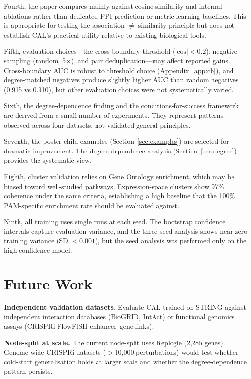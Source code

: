 \documentclass[11pt]{article}
\begin{document}
Fourth, the paper compares mainly against cosine similarity and internal ablations rather than dedicated PPI prediction or metric-learning baselines. This is appropriate for testing the association $\neq$ similarity principle but does not establish CAL's practical utility relative to existing biological tools.

Fifth, evaluation choices---the cross-boundary threshold ($|\text{cos}| < 0.2$), negative sampling (random, 5$\times$), and pair deduplication---may affect reported gains. Cross-boundary AUC is robust to threshold choice (Appendix~\ref{app:cb}), and degree-matched negatives produce slightly higher AUC than random negatives (0.915 vs 0.910), but other evaluation choices were not systematically varied.

Sixth, the degree-dependence finding and the conditions-for-success framework are derived from a small number of experiments. They represent patterns observed across four datasets, not validated general principles.

Seventh, the poster child examples (Section~\ref{sec:examples}) are selected for dramatic improvement. The degree-dependence analysis (Section~\ref{sec:degree}) provides the systematic view.

Eighth, cluster validation relies on Gene Ontology enrichment, which may be biased toward well-studied pathways. Expression-space clusters show 97\% coherence under the same criteria, establishing a high baseline that the 100\% PAM-specific enrichment rate should be evaluated against.

Ninth, all training uses single runs at each seed. The bootstrap confidence intervals capture evaluation variance, and the three-seed analysis shows near-zero training variance (SD $< 0.001$), but the seed analysis was performed only on the high-confidence model.

\section{Future Work}
\label{sec:future}

\textbf{Independent validation datasets.} Evaluate CAL trained on STRING against independent interaction databases (BioGRID, IntAct) or functional genomics assays (CRISPRi-FlowFISH enhancer--gene links).

\textbf{Node-split at scale.} The current node-split uses Replogle (2,285 genes). Genome-wide CRISPRi datasets ($>$10,000 perturbations) would test whether cold-start generalisation holds at larger scale and whether the degree-dependence pattern persists.
\end{document}
